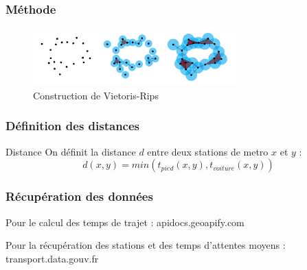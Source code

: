 \documentclass{beamer}
\begin{document}
\begin{frame}
    \frametitle{Méthode}
    \begin{figure}
        \includegraphics[width=0.7\textwidth]{cech}
        \centering
        \caption{Construction de Vietoris-Rips}
    \end{figure}
    
\end{frame}

\begin{frame}
    \frametitle{Définition des distances}
    
    \begin{block}{Distance}
        On définit la distance $d$ entre deux stations de metro $x$ et $y$ : 
        $$ d(x,y) =  min(t_{pied}(x,y), t_{voiture}(x,y))$$
    \end{block}
\end{frame}

\begin{frame}
    \frametitle{Récupération des données}
    Pour le calcul des temps de trajet :  apidocs.geoapify.com

    Pour la récupération des stations et des temps d'attentes moyens : transport.data.gouv.fr
\end{frame}
\end{document}
